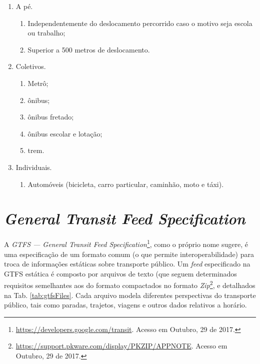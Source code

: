 \documentclass[
	12pt,				%
	oneside,			%
	a4paper,			%
	english,			%
	brazil				%
	]{abntex2ppgsi}
\begin{document}
\begin{enumerate}
\item A pé.
\begin{enumerate}
\item Independentemente do deslocamento percorrido caso o motivo seja escola ou trabalho;
\item  Superior a 500 metros de deslocamento.
\end{enumerate}
\item Coletivos.
\begin{enumerate}
\item Metrô;
\item ônibus;
\item ônibus fretado;
\item ônibus escolar e lotação;
\item trem.
\end{enumerate}
\item Individuais.
\begin{enumerate}
\item Automóveis (bicicleta, carro particular, caminhão, moto e táxi).
\end{enumerate}
\end{enumerate}


\section{\textit{General Transit Feed Specification}}
\label{gtfs}

A \textit{GTFS --- General Transit Feed Specification}\footnote{\label{googleTransit}\url{https://developers.google.com/transit}. Acesso em Outubro, 29 de 2017.}, como o próprio nome sugere, é uma especificação de um formato comum (o que permite interoperabilidade) para troca de informações estáticas sobre transporte público.  Um \textit{feed} especificado na GTFS estática é composto por arquivos de texto (que seguem determinados requisitos semelhantes aos do formato   compactados no formato \textit{Zip}\footnote{\url{https://support.pkware.com/display/PKZIP/APPNOTE}. Acesso em Outubro, 29 de 2017.}, e detalhados na Tab. \ref{tab:gtfsFiles}. Cada arquivo modela diferentes perspectivas do transporte público, tais como paradas, trajetos, viagens e outros dados relativos a horário.
\end{document}

